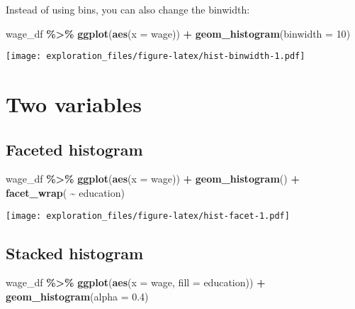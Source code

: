 \documentclass[
]{book}
\newenvironment{Shaded}{\begin{snugshade}}{\end{snugshade}}
\newcommand{\DataTypeTok}[1]{\textcolor[rgb]{0.13,0.29,0.53}{#1}}
\newcommand{\DecValTok}[1]{\textcolor[rgb]{0.00,0.00,0.81}{#1}}
\newcommand{\FloatTok}[1]{\textcolor[rgb]{0.00,0.00,0.81}{#1}}
\newcommand{\KeywordTok}[1]{\textcolor[rgb]{0.13,0.29,0.53}{\textbf{#1}}}
\newcommand{\NormalTok}[1]{#1}
\newcommand{\OperatorTok}[1]{\textcolor[rgb]{0.81,0.36,0.00}{\textbf{#1}}}
\newcommand{\StringTok}[1]{\textcolor[rgb]{0.31,0.60,0.02}{#1}}
\begin{document}
Instead of using bins, you can also change the binwidth:

\begin{Shaded}
\begin{Highlighting}[]
\NormalTok{wage\_df }\OperatorTok{\%\textgreater{}\%}\StringTok{ }
\StringTok{  }\KeywordTok{ggplot}\NormalTok{(}\KeywordTok{aes}\NormalTok{(}\DataTypeTok{x =}\NormalTok{ wage)) }\OperatorTok{+}
\StringTok{  }\KeywordTok{geom\_histogram}\NormalTok{(}\DataTypeTok{binwidth =} \DecValTok{10}\NormalTok{)}
\end{Highlighting}
\end{Shaded}

\texttt{[image: exploration\_files/figure-latex/hist-binwidth-1.pdf]}

\hypertarget{two-variables-1}{%
\section{Two variables}\label{two-variables-1}}

\hypertarget{faceted-histogram}{%
\subsection{Faceted histogram}\label{faceted-histogram}}

\begin{Shaded}
\begin{Highlighting}[]
\NormalTok{wage\_df }\OperatorTok{\%\textgreater{}\%}\StringTok{ }
\StringTok{  }\KeywordTok{ggplot}\NormalTok{(}\KeywordTok{aes}\NormalTok{(}\DataTypeTok{x =}\NormalTok{ wage)) }\OperatorTok{+}
\StringTok{  }\KeywordTok{geom\_histogram}\NormalTok{() }\OperatorTok{+}
\StringTok{  }\KeywordTok{facet\_wrap}\NormalTok{( }\OperatorTok{\textasciitilde{}}\StringTok{ }\NormalTok{education)}
\end{Highlighting}
\end{Shaded}

\texttt{[image: exploration\_files/figure-latex/hist-facet-1.pdf]}

\hypertarget{stacked-histogram}{%
\subsection{Stacked histogram}\label{stacked-histogram}}

\begin{Shaded}
\begin{Highlighting}[]
\NormalTok{wage\_df }\OperatorTok{\%\textgreater{}\%}\StringTok{ }
\StringTok{  }\KeywordTok{ggplot}\NormalTok{(}\KeywordTok{aes}\NormalTok{(}\DataTypeTok{x =}\NormalTok{ wage, }\DataTypeTok{fill =}\NormalTok{ education)) }\OperatorTok{+}
\StringTok{  }\KeywordTok{geom\_histogram}\NormalTok{(}\DataTypeTok{alpha =} \FloatTok{0.4}\NormalTok{)}
\end{Highlighting}
\end{Shaded}
\end{document}
